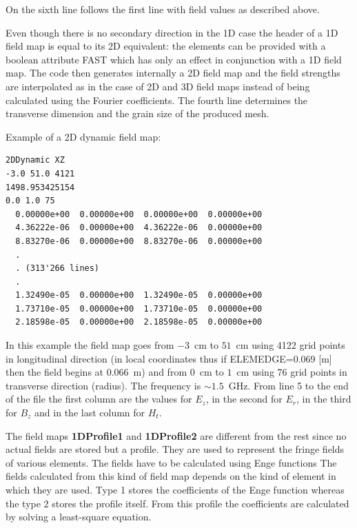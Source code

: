 On the sixth line follows the first line with field values as described above.

Even though there is no secondary direction in the 1D case the header of a 1D field map is equal to its 2D equivalent: the elements can be provided with a boolean attribute FAST which has only an effect in conjunction with a 1D field map. The code then generates internally a 2D field map and the field strengths are interpolated as in the case of 2D and 3D field maps instead of being calculated using the Fourier coefficients. The fourth line determines the transverse dimension and the grain size of the produced mesh.

\noindent Example of a 2D dynamic field map:
\begin{verbatim}
2DDynamic XZ
-3.0 51.0 4121
1498.953425154
0.0 1.0 75
  0.00000e+00  0.00000e+00  0.00000e+00  0.00000e+00
  4.36222e-06  0.00000e+00  4.36222e-06  0.00000e+00
  8.83270e-06  0.00000e+00  8.83270e-06  0.00000e+00
  .
  . (313'266 lines)
  .
  1.32490e-05  0.00000e+00  1.32490e-05  0.00000e+00
  1.73710e-05  0.00000e+00  1.73710e-05  0.00000e+00
  2.18598e-05  0.00000e+00  2.18598e-05  0.00000e+00
\end{verbatim}
In this example the field map goes from $-3$~cm to $51$~cm using 4122 grid points in longitudinal direction (in local coordinates thus if ELEMEDGE=0.069 [m] then the field begins at $0.066$~m) and from $0$~cm to $1$~cm using 76 grid points in transverse direction (radius). The frequency is $\sim 1.5$~GHz. From line 5 to the end of the file the first column are the values for $E_z$, in the second for $E_r$, in the third for $B_z$ and in the last column for $H_t$.

The field maps {\bf 1DProfile1} and {\bf 1DProfile2} are different from the rest since no actual fields are stored but a profile. They are used to represent the fringe fields of various elements. The fields have to be calculated using Enge functions \cite{enge} The fields calculated from this kind of field map depends on the kind of element in which they are used. Type 1 stores the coefficients of the Enge function whereas the type 2 stores the profile itself. From this profile the coefficients are calculated by solving a least-square equation. 

